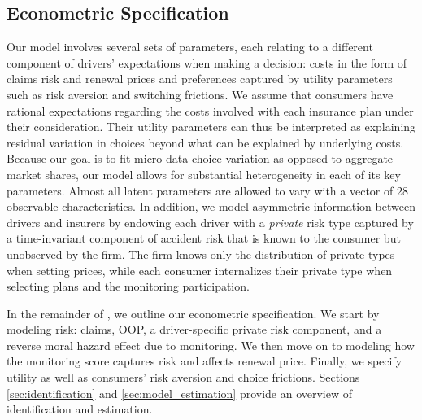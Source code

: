 \subsection{Econometric Specification} \label{sec:econometric-model}
Our model involves several sets of parameters, each relating to a different component of drivers' expectations when making a decision: costs in the form of claims risk and renewal prices and preferences captured by utility parameters such as risk aversion and switching frictions.
We assume that consumers have rational expectations regarding the costs involved with each insurance plan under their consideration. Their utility parameters can thus be interpreted as explaining residual variation in choices beyond what can be explained by underlying costs. Because our goal is to fit micro-data choice variation as opposed to aggregate market shares, our model allows for substantial heterogeneity in each of its key parameters. Almost all latent parameters are allowed to vary with a vector of 28 observable characteristics. In addition, we model asymmetric information between drivers and insurers by endowing each driver with a \textit{private} risk type captured by a time-invariant component of accident risk that is known to the consumer but unobserved by the firm. The firm knows only the distribution of private types when setting prices, while each consumer internalizes their private type when selecting plans and the monitoring participation.

In the remainder of , we outline our econometric specification. We start by modeling risk: claims, OOP, a driver-specific private risk component, and a reverse moral hazard effect due to monitoring. We then move on to modeling how the monitoring score captures risk and affects renewal price. Finally, we specify utility as well as consumers' risk aversion and choice frictions. Sections \ref{sec:identification} and \ref{sec:model_estimation} provide an overview of identification and estimation.


